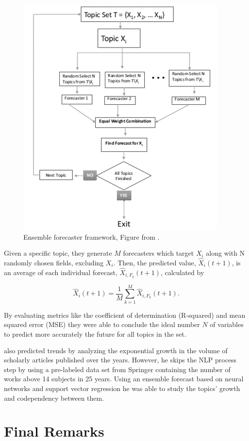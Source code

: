 \begin{figure}[h!]
	\centering
	\includegraphics[width=0.5\linewidth]{01.Chapters/03.RelatedWorks/ensemble-forecasting-framework}
	\caption{Ensemble forecaster framework, Figure from  \cite{hurtado2016topic}.}
	\label{fig:ensemble-forecasting-framework}
\end{figure}

Given a specific topic, they generate $M$ forecasters which target $X_{i}$ along with N randomly chosen fields, excluding $X_{i}$. Then, the predicted value, $\hat{X}_{i}(t+1)$, is an average of each individual forecast, $\hat{X}_{i, F_{k}}(t+1)$, calculated by 

\begin{equation}
	\hat{X}_{i}(t+1) = \dfrac{1}{M} \sum_{k=1}^{M}\hat{X}_{i, F_{k}}(t+1)\text{.}
\end{equation}

By evaluating metrics like the coefficient of determination (R-squared) and mean squared error (MSE) they were able to conclude the ideal number $N$ of variables to predict more accurately the future for all topics in the set.

 also predicted trends by analyzing the exponential growth in the volume of scholarly articles published over the years. However, he skips the NLP process step by using a pre-labeled data set from Springer containing the number of works above 14 subjects in 25 years. Using an ensemble forecast based on neural networks and support vector regression he was able to study the topics' growth and codependency between them.


\newpage
\section{Final Remarks}

